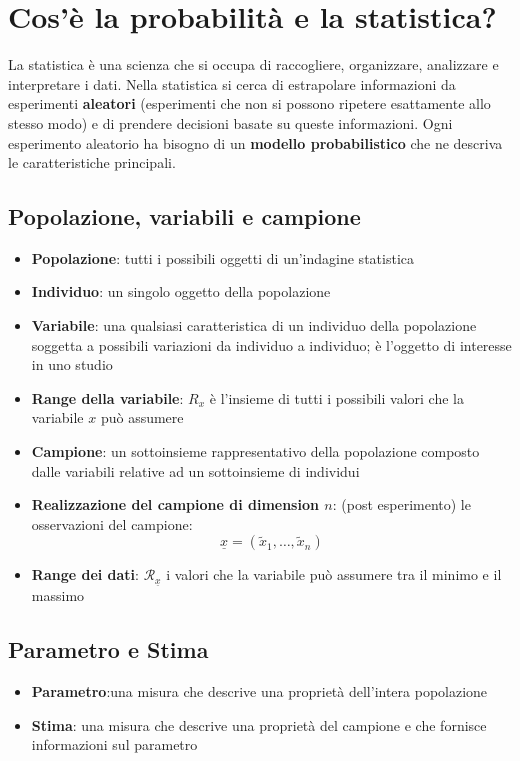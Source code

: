 \documentclass[a4paper]{article}
\theoremstyle{break}
\theoremstyle{break}
\theoremstyle{break}
\theoremstyle{break}
\begin{document}


\tableofcontents
\pagebreak


\section{Cos'è la probabilità e la statistica?}
La statistica è una scienza che si occupa di raccogliere, organizzare, analizzare
e interpretare i dati. Nella statistica si cerca di estrapolare informazioni da
esperimenti \textbf{aleatori} (esperimenti che non si possono ripetere esattamente allo stesso
modo) e di prendere decisioni basate su queste informazioni. Ogni esperimento aleatorio
ha bisogno di un \textbf{modello probabilistico} che ne descriva le caratteristiche principali.

\subsection{Popolazione, variabili e campione}
\begin{itemize}
	\item \textbf{Popolazione}: tutti i possibili oggetti di un'indagine statistica
	\item \textbf{Individuo}: un singolo oggetto della popolazione
	\item \textbf{Variabile}: una qualsiasi caratteristica di un individuo della
	      popolazione soggetta a possibili variazioni da individuo a individuo; è l'oggetto
        di interesse in uno studio
	\item \textbf{Range della variabile}: \( R_x \) è l'insieme di tutti i possibili
	      valori che la variabile \( x \) può assumere
	\item \textbf{Campione}: un sottoinsieme rappresentativo della popolazione
	      composto dalle variabili relative ad un sottoinsieme di individui
	\item \textbf{Realizzazione del campione di dimension \( n \)}: (post esperimento)
    le osservazioni del campione:\[
      \underline{x} = (\tilde{x}_1, \ldots, \tilde{x}_n)
    \] 
  \item \textbf{Range dei dati}: \( \mathcal{R}_{\underline{x}} \) i valori che la
    variabile può assumere tra il minimo e il massimo
\end{itemize}

\subsection{Parametro e Stima}
\begin{itemize}
	\item \textbf{Parametro}:una misura che descrive una proprietà dell'intera popolazione
	\item \textbf{Stima}: una misura che descrive una proprietà del campione e che
	      fornisce informazioni sul parametro
\end{itemize}
\end{document}
